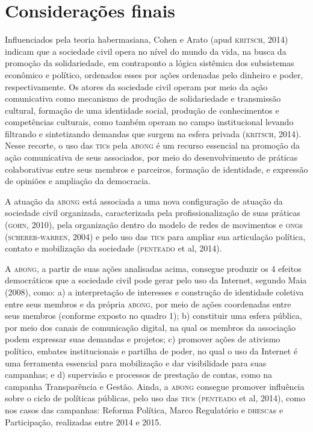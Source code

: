 \section{Considerações finais}

Influenciados pela teoria habermasiana, Cohen e Arato (apud \textsc{kritsch},
2014) indicam que a sociedade civil opera no nível do mundo da vida, na
busca da promoção da solidariedade, em contraponto a lógica sistêmica
dos subsistemas econômico e político, ordenados esses por ações
ordenadas pelo dinheiro e poder, respectivamente. Os atores da sociedade
civil operam por meio da ação comunicativa como mecanismo de produção de
solidariedade e transmissão cultural, formação de uma identidade social,
produção de conhecimentos e competências culturais, como também operam
no campo institucional levando filtrando e sintetizando demandas que
surgem na esfera privada (\textsc{kritsch}, 2014). Nesse recorte, o uso das \textsc{tic}s
pela \textsc{abong} é um recurso essencial na promoção da ação comunicativa de
seus associados, por meio do desenvolvimento de práticas colaborativas
entre seus membros e parceiros, formação de identidade, e expressão de
opiniões e ampliação da democracia.

A atuação da \textsc{abong} está associada a uma nova configuração de atuação da
sociedade civil organizada, caracterizada pela profissionalização de
suas práticas (\textsc{gohn}, 2010), pela organização dentro do modelo de
redes de movimentos e \textsc{ong}s (\textsc{scherer}-\textsc{warren}, 2004) e pelo uso das
\textsc{tic}s para ampliar sua articulação política, contato e mobilização da
sociedade (\textsc{penteado} et al, 2014).

A \textsc{abong}, a partir de suas ações analisadas acima, consegue produzir os 4
efeitos democráticos que a sociedade civil pode gerar pelo uso da
Internet, segundo Maia (2008), como: a) a interpretação de interesses e
construção de identidade coletiva entre seus membros e da própria \textsc{abong},
por meio de ações coordenadas entre seus membros (conforme exposto no
quadro 1); b) constituir uma esfera pública, por meio dos canais de
comunicação digital, na qual os membros da associação podem expressar
suas demandas e projetos; c) promover ações de ativismo político,
embates institucionais e partilha de poder, no qual o uso da Internet é
uma ferramenta essencial para mobilização e dar visibilidade para suas
campanhas; e d) supervisão e processos de prestação de contas, como na
campanha Transparência e Gestão. Ainda, a \textsc{abong} consegue promover
influência sobre o ciclo de políticas públicas, pelo uso das \textsc{tic}s
(\textsc{penteado} et al, 2014), como nos casos das campanhas: Reforma Política,
Marco Regulatório e \textsc{dhesca}s e Participação, realizadas entre 2014 e
2015.

